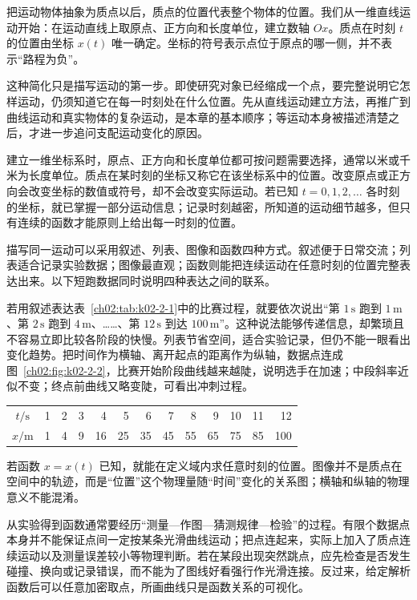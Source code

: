 {把运动物体抽象为质点以后，质点的位置代表整个物体的位置。我们从一维直线运动开始：在运动直线上取原点、正方向和长度单位，建立数轴 $Ox$。质点在时刻 $t$ 的位置由坐标 $x(t)$ 唯一确定。坐标的符号表示点位于原点的哪一侧，并不表示“路程为负”。

这种简化只是描写运动的第一步。即使研究对象已经缩成一个点，要完整说明它怎样运动，仍须知道它在每一时刻处在什么位置。先从直线运动建立方法，再推广到曲线运动和真实物体的复杂运动，是本章的基本顺序；等运动本身被描述清楚之后，才进一步追问支配运动变化的原因。

建立一维坐标系时，原点、正方向和长度单位都可按问题需要选择，通常以米或千米为长度单位。质点在某时刻的坐标又称它在该坐标系中的位置。改变原点或正方向会改变坐标的数值或符号，却不会改变实际运动。若已知 $t=0,1,2,\ldots$ 各时刻的坐标，就已掌握一部分运动信息；记录时刻越密，所知道的运动细节越多，但只有连续的函数才能原则上给出每一时刻的位置。

描写同一运动可以采用叙述、列表、图像和函数四种方式。叙述便于日常交流；列表适合记录实验数据；图像最直观；函数则能把连续运动在任意时刻的位置完整表达出来。以下短跑数据同时说明四种表达之间的联系。

若用叙述表达表~\ref{ch02:tab:k02-2-1}中的比赛过程，就要依次说出“第 $1\,\mathrm{s}$ 跑到 $1\,\mathrm{m}$、第 $2\,\mathrm{s}$ 跑到 $4\,\mathrm{m}$、……、第 $12\,\mathrm{s}$ 到达 $100\,\mathrm{m}$”。这种说法能够传递信息，却繁琐且不容易立即比较各阶段的快慢。列表节省空间，适合实验记录，但仍不能一眼看出变化趋势。把时间作为横轴、离开起点的距离作为纵轴，数据点连成图~\ref{ch02:fig:k02-2-2}，比赛开始阶段曲线越来越陡，说明选手在加速；中段斜率近似不变；终点前曲线又略变陡，可看出冲刺过程。

\begin{center}\small
\begin{tabular}{c*{12}{r}}
\toprule
$t/\mathrm{s}$&1&2&3&4&5&6&7&8&9&10&11&12\\
$x/\mathrm{m}$&1&4&9&16&25&35&45&55&65&75&85&100\\
\bottomrule
\end{tabular}
\label{ch02:tab:k02-2-1}
\end{center}

\SprintGraph

若函数 $x=x(t)$ 已知，就能在定义域内求任意时刻的位置。图像并不是质点在空间中的轨迹，而是“位置”这个物理量随“时间”变化的关系图；横轴和纵轴的物理意义不能混淆。

从实验得到函数通常要经历“测量—作图—猜测规律—检验”的过程。有限个数据点本身并不能保证点间一定按某条光滑曲线运动；把点连起来，实际上加入了质点连续运动以及测量误差较小等物理判断。若在某段出现突然跳点，应先检查是否发生碰撞、换向或记录错误，而不能为了图线好看强行作光滑连接。反过来，给定解析函数后可以任意加密取点，所画曲线只是函数关系的可视化。

}
